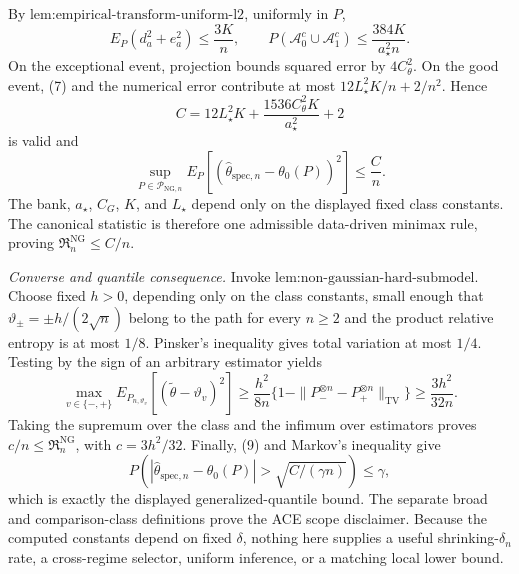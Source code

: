 By \(\text{lem:empirical-transform-uniform-l2}\), uniformly in \(P\),
\[
 E_P(d_a^2+e_a^2)\le\frac{3K}{n},
 \qquad
 P(\mathcal A_0^c\cup\mathcal A_1^c)
 \le\frac{384K}{a_{\star}^2n}. \tag{8}
\]
On the exceptional event, projection bounds squared error by \(4C_{\theta}^2\).  On the good event, (7) and the numerical error contribute at most \(12L_{\star}^2K/n+2/n^2\).  Hence
\[
 C=12L_{\star}^2K+\frac{1536C_{\theta}^2K}{a_{\star}^2}+2
\]
is valid and
\[
 \sup_{P\in\mathcal P_{\mathrm{NG},n}}
 E_P[(\widehat\theta_{\mathrm{spec},n}-\theta_0(P))^2]
 \le\frac Cn. \tag{9}
\]
The bank, \(a_{\star}\), \(C_G\), \(K\), and \(L_{\star}\) depend only on the displayed fixed class constants.  The canonical statistic is therefore one admissible data-driven minimax rule, proving \(\mathfrak R_n^{\mathrm{NG}}\le C/n\).

\emph{Converse and quantile consequence.}  Invoke \(\text{lem:non-gaussian-hard-submodel}\).  Choose fixed \(h>0\), depending only on the class constants, small enough that \(\vartheta_{\pm}=\pm h/(2\sqrt n)\) belong to the path for every \(n\ge2\) and the product relative entropy is at most \(1/8\).  Pinsker's inequality gives total variation at most \(1/4\).  Testing by the sign of an arbitrary estimator yields
\[
 \max_{v\in\{-,+\}}E_{P_{n,\vartheta_v}}
 [ (\widetilde\theta-\vartheta_v)^2]
 \ge\frac{h^2}{8n}
 \{1-\|P_-^{\otimes n}-P_+^{\otimes n}\|_{\mathrm{TV}}\}
 \ge\frac{3h^2}{32n}.
\]
Taking the supremum over the class and the infimum over estimators proves \(c/n\le\mathfrak R_n^{\mathrm{NG}}\), with \(c=3h^2/32\).  Finally, (9) and Markov's inequality give
\[
 P\!\left(|\widehat\theta_{\mathrm{spec},n}-\theta_0(P)|>
 \sqrt{C/(\gamma n)}\right)\le\gamma,
\]
which is exactly the displayed generalized-quantile bound.  The separate broad and comparison-class definitions prove the ACE scope disclaimer.  Because the computed constants depend on fixed \(\delta\), nothing here supplies a useful shrinking-\(\delta_n\) rate, a cross-regime selector, uniform inference, or a matching local lower bound.